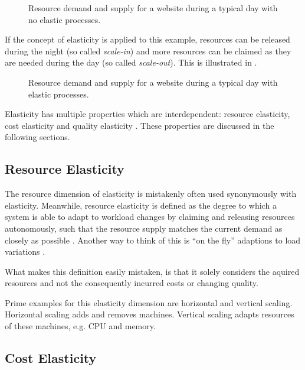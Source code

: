 \begin{figure}
    \centering
    
    \caption{Resource demand and supply for a website during a typical day with no elastic processes.}
    \label{fig:elasticity-application-no-scaling}
\end{figure}

If the concept of elasticity is applied to this example, resources can be released during the night (so called \textit{scale-in}) and more resources can be claimed as they are needed during the day (so called \textit{scale-out}). This is illustrated in .

\begin{figure}
    \centering
    
    \caption{Resource demand and supply for a website during a typical day with elastic processes.}
    \label{fig:elasticity-application-scaling}
\end{figure}

Elasticity has multiple properties which are interdependent: resource elasticity, cost elasticity and quality elasticity \cite{dustdarPrinciplesElasticProcesses2011}. These properties are discussed in the following sections.

\subsection{Resource Elasticity}

The resource dimension of elasticity is mistakenly often used synonymously with elasticity. Meanwhile, resource elasticity is defined as the degree to which a system is able to adapt to workload changes by claiming and releasing resources autonomously, such that the resource supply matches the current demand as closely as possible \cite{herbstElasticityCloudComputing2013}. Another way to think of this is ``on the fly'' adaptions to load variations \cite{al-dhuraibiElasticityCloudComputing2018}.

What makes this definition easily mistaken, is that it solely considers the aquired resources and not the consequently incurred costs or changing quality.

Prime examples for this elasticity dimension are horizontal and vertical scaling. Horizontal scaling adds and removes machines. Vertical scaling adapts resources of these machines, e.g. CPU and memory.

\subsection{Cost Elasticity}

